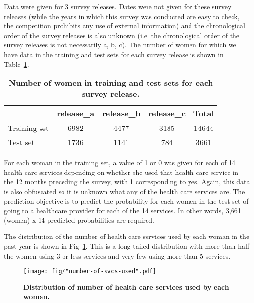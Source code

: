 \documentclass{article}\usepackage[]{graphicx}\usepackage[]{color}
\begin{document}
Data were given for 3 survey releases. Dates were not given for these survey releases (while the years in which this survey was conducted are easy to check, the competition prohibits any use of external information) and the chronological order of the survey releases is also unknown (i.e. the chronological order of the survey releases is not necessarily a, b, c). The number of women for which we have data in the training and test sets for each survey release is shown in Table~\ref{tab-num-women}.

\begin{table}[ht]
\centering
\begin{tabular}{@{}|l|c|c|c|c|@{}}
\hline
& release\_a & release\_b & release\_c & Total \\ 
\hline
Training set & 6982 & 4477 & 3185 & 14644\\ 
Test set & 1736 & 1141 & 784 & 3661\\ 
\hline
\end{tabular}
\caption{\textbf{Number of women in training and test sets for each survey release.}} 
\label{tab-num-women}
\end{table}

For each woman in the training set, a value of 1 or 0 was given for each of 14 health care services depending on whether she used that health care service in the 12 months preceding the survey, with 1 corresponding to yes. Again, this data is also obfuscated so it is unknown what any of the health care services are. The prediction objective is to predict the probability for each women in the test set of going to a healthcare provider for each of the 14 services. In other words, 3,661 (women) x 14 predicted probabilities are required.

The distribution of the number of health care services used by each woman in the past year is shown in Fig~\ref{fig-num-svcs}. This is a long-tailed distribution with more than half the women using 3 or less services and very few using more than 5 services.

\begin{figure}[htbp]
\begin{center}
\texttt{[image: fig/"number-of-svcs-used".pdf]}
\caption{\textbf{Distribution of number of health care services used by each woman.}}
\label{fig-num-svcs}
\end{center}
\end{figure}
\end{document}

